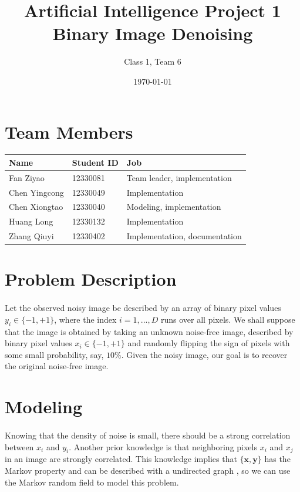 \documentclass{article}
\title{}
\begin{document}


\title{
Artificial Intelligence Project 1 \\
Binary Image Denoising
}
\author{Class 1, Team 6}
\date{\today}
\maketitle

\section{Team Members}

\begin{table}[H]
\centering
\begin{tabular}{l l l}
Name & Student ID  & Job\\
\hline
Fan Ziyao & 12330081 & Team leader, implementation\\
Chen Yingcong & 12330049 & Implementation \\
Chen Xiongtao & 12330040 & Modeling, implementation \\
Huang Long & 12330132 & Implementation \\
Zhang Qiuyi & 12330402 & Implementation, documentation

\end{tabular}
\end{table}

\section{Problem Description}
\paragraph{}
Let the observed noisy image be described by an array of binary pixel values $y_i \in \{−1, +1\}$, where the index $i = 1, ..., D$ runs over all pixels. We shall suppose that the image is obtained by taking an unknown noise-free image, described by binary pixel values $x_i \in \{−1, +1\}$ and randomly flipping the sign of pixels with some small probability, say, $10\%$. Given the noisy image, our goal is to recover the original noise-free image.

\section{Modeling}
\paragraph{}
Knowing that the density of noise is small, there should be a strong correlation between $x_i$ and $y_i$. Another prior knowledge is that neighboring pixels $x_i$ and $x_j$ in an image are strongly correlated. This knowledge implies that $\{\mathbf{x}, \mathbf{y}\}$ has the Markov property and can be described with a undirected graph \cite{bishop2006pattern}, so we can use the Markov random field to model this problem.
\end{document}
